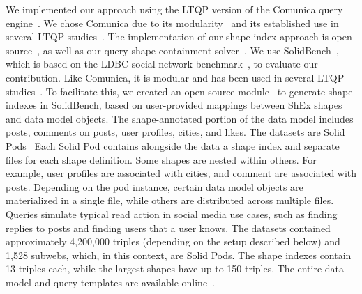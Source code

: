 We implemented our approach using the LTQP version of the Comunica query engine~\cite{taelman_iswc_resources_comunica_2018}.
We chose Comunica due to its modularity~\cite{taelman_swj_componentsjs_2022} and its established use in several LTQP studies~\cite{Bogaerts2021LinkTW, Taelman2023, eschauzier_quweda_linkqueue_2023, Hanski2024, eschauzier_amw_rcubemetric_2024, tam2024opportunitiesshapebasedoptimizationlink}.
The implementation of our shape index approach is open source~, as well as our query-shape containment solver~.
We use SolidBench~\cite{Taelman2023}, which is based on the LDBC social network benchmark~\cite{Angles2020}, to evaluate our contribution.
Like Comunica, it is modular and has been used in several LTQP studies~\cite{Bogaerts2021LinkTW, Taelman2023, eschauzier_quweda_linkqueue_2023, Hanski2024, eschauzier_amw_rcubemetric_2024, tam2024opportunitiesshapebasedoptimizationlink}.
To facilitate this, we created an open-source module~ to generate shape indexes in SolidBench, based on user-provided mappings between ShEx shapes and data model objects.
The shape-annotated portion of the data model includes posts, comments on posts, user profiles, cities, and likes.
The datasets are Solid Pods~\cite{dedecker2022s}
Each Solid Pod contains alongside the data a shape index and separate files for each shape definition.
Some shapes are nested within others. 
For example, user profiles are associated with cities, and comment are associated with posts.
Depending on the pod instance, certain data model objects are materialized in a single file, while others are distributed across multiple files.
Queries simulate typical read action in social media use cases, such as finding replies to posts and finding users that a user knows.
The datasets contained approximately 4,200,000 triples (depending on the setup described below) and 1,528 subwebs, which, in this context, are Solid Pods.
The shape indexes contain 13 triples each, while the largest shapes have up to 150 triples.
The entire data model and query templates are available online~.

